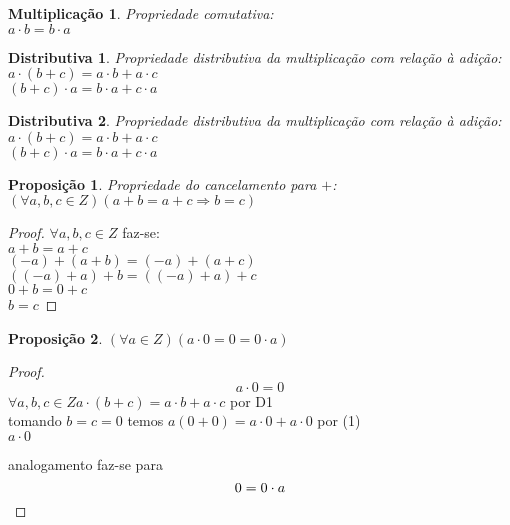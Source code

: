 \documentclass[a4paper,12pt]{article}
\newtheorem{mult}{Multiplicação}
\newtheorem{dist}{Distributiva}
\newtheorem{prop}{Proposição}
\begin{document}
\begin{mult} %
  Propriedade comutativa:\\
  $a \cdot b = b \cdot a$
\end{mult}

\begin{dist} %
  Propriedade distributiva da multiplicação com relação à adição:\\
  $a \cdot (b + c) = a \cdot b + a \cdot c$\\
  $(b + c) \cdot a = b \cdot a + c \cdot a$
\end{dist}

\begin{dist} %
  Propriedade distributiva da multiplicação com relação à adição:\\
  $a \cdot (b + c) = a \cdot b + a \cdot c$\\
  $(b + c) \cdot a = b \cdot a + c \cdot a$
\end{dist}

\begin{prop} %
  Propriedade do cancelamento para $+$:\\
  $(\forall a, b, c \in Z)(a + b = a + c \Longrightarrow b = c)$\\
\end{prop}
\begin{proof}
  $\forall a, b, c \in Z$ faz-se:\\ %
  $a + b = a + c$\\ %
  $(-a) + (a + b) = (-a) + (a + c)$\\ %
  $((-a) + a) + b = ((-a) + a) + c$\\ %
  $0 + b = 0 + c$\\
  $b = c$
\end{proof}

\begin{prop} %
  $(\forall a \in Z)(a \cdot 0 = 0 = 0 \cdot a)$
\end{prop}
\begin{proof}
  \begin{equation}
    a \cdot 0 = 0
  \end{equation}
  $\forall a, b, c \in Z a \cdot (b + c) = a \cdot b + a \cdot c$ por D1\\
  tomando $b = c = 0$ temos $a (0 + 0) = a \cdot 0 + a \cdot 0$ por (1)\\
  $a \cdot 0 $

  analogamento faz-se para
  \begin{equation}
    \\
    0 = 0 \cdot a
  \end{equation}
\end{proof}
\end{document}

